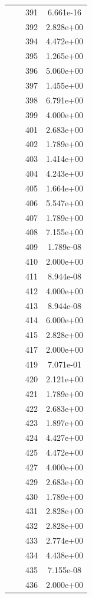 \documentclass[12pt]{article}
\begin{document}
\begin{longtable}{@{}cccc@{}}
 &  & 391 & 6.661e-16 \\
 &  & 392 & 2.828e+00 \\
 &  & 394 & 4.472e+00 \\
 &  & 395 & 1.265e+00 \\
 &  & 396 & 5.060e+00 \\
 &  & 397 & 1.455e+00 \\
 &  & 398 & 6.791e+00 \\
 &  & 399 & 4.000e+00 \\
 &  & 401 & 2.683e+00 \\
 &  & 402 & 1.789e+00 \\
 &  & 403 & 1.414e+00 \\
 &  & 404 & 4.243e+00 \\
 &  & 405 & 1.664e+00 \\
 &  & 406 & 5.547e+00 \\
 &  & 407 & 1.789e+00 \\
 &  & 408 & 7.155e+00 \\
 &  & 409 & 1.789e-08 \\
 &  & 410 & 2.000e+00 \\
 &  & 411 & 8.944e-08 \\
 &  & 412 & 4.000e+00 \\
 &  & 413 & 8.944e-08 \\
 &  & 414 & 6.000e+00 \\
 &  & 415 & 2.828e+00 \\
 &  & 417 & 2.000e+00 \\
 &  & 419 & 7.071e-01 \\
 &  & 420 & 2.121e+00 \\
 &  & 421 & 1.789e+00 \\
 &  & 422 & 2.683e+00 \\
 &  & 423 & 1.897e+00 \\
 &  & 424 & 4.427e+00 \\
 &  & 425 & 4.472e+00 \\
 &  & 427 & 4.000e+00 \\
 &  & 429 & 2.683e+00 \\
 &  & 430 & 1.789e+00 \\
 &  & 431 & 2.828e+00 \\
 &  & 432 & 2.828e+00 \\
 &  & 433 & 2.774e+00 \\
 &  & 434 & 4.438e+00 \\
 &  & 435 & 7.155e-08 \\
 &  & 436 & 2.000e+00 \\

\end{longtable}
\end{document}
